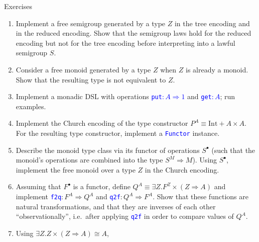 \documentclass[english,,russian]{beamer}
\begin{document}
\begin{frame}{Exercises}
\begin{enumerate}
\item {\footnotesize{}\vspace{-0.2cm}Implement a free semigroup generated
by a type $Z$ in the tree encoding and in the reduced encoding. Show
that the semigroup laws hold for the reduced encoding but not for
the tree encoding before interpreting into a lawful semigroup $S$.}{\footnotesize\par}
\item {\footnotesize{}Consider a free monoid generated by a type $Z$ when
$Z$ is already a monoid. Show that the resulting type is not equivalent
to $Z$.}{\footnotesize\par}
\item {\footnotesize{}Implement a monadic DSL with operations }\texttt{\textcolor{blue}{\footnotesize{}put$:A\Rightarrow1$}}{\footnotesize{}
and }\texttt{\textcolor{blue}{\footnotesize{}get$:A$}}{\footnotesize{};
run examples.}{\footnotesize\par}
\item {\footnotesize{}Implement the Church encoding of the type constructor
$P^{A}\equiv\text{Int}+A\times A$. For the resulting type constructor,
implement a }\texttt{\textcolor{blue}{\footnotesize{}Functor}}{\footnotesize{}
instance.}{\footnotesize\par}
\item {\footnotesize{}Describe the monoid type class via its functor of
operations $S^{\bullet}$ (such that the monoid's operations are combined
into the type $S^{M}\Rightarrow M$). Using $S^{\bullet}$, implement
the free monoid over a type $Z$ in the Church encoding.}{\footnotesize\par}
\item {\footnotesize{}Assuming that $F^{\bullet}$ is a functor, define
$Q^{A}\equiv\exists Z.F^{Z}\times\left(Z\Rightarrow A\right)$ and
implement }\texttt{\textcolor{blue}{\footnotesize{}f2q}}{\footnotesize{}$:F^{A}\Rightarrow Q^{A}$
and }\texttt{\textcolor{blue}{\footnotesize{}q2f}}{\footnotesize{}$:Q^{A}\Rightarrow F^{A}$.
Show that these functions are natural transformations, and that they
are inverses of each other ``observationally'', i.e.~after applying
}\texttt{\textcolor{blue}{\footnotesize{}q2f}}{\footnotesize{} in
order to compare values of $Q^{A}$.}{\footnotesize\par}
\item {\footnotesize{}Using $\exists Z.Z\times\left(Z\Rightarrow A\right)\cong A$,
}
\end{enumerate}
\end{frame}
\end{document}
